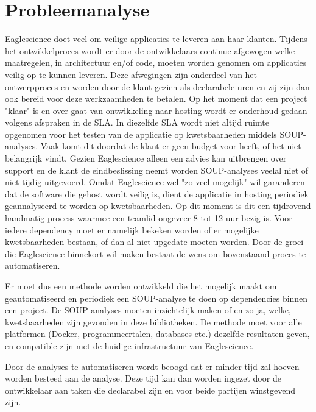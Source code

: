 \section{Probleemanalyse}\label{sec:probleemanalyse}
Eaglescience doet veel om veilige applicaties te leveren aan haar klanten. Tijdens het ontwikkelproces wordt er door de ontwikkelaars continue afgewogen welke maatregelen, in architectuur en/of code, moeten worden genomen om applicaties veilig op te kunnen leveren. Deze afwegingen zijn onderdeel van het ontwerpproces en worden door de klant gezien als declarabele uren en zij zijn dan ook bereid voor deze werkzaamheden te betalen. Op het moment dat een project "klaar" is en over gaat van ontwikkeling naar hosting wordt er onderhoud gedaan volgens afspraken in de SLA. In diezelfde SLA wordt niet altijd ruimte opgenomen voor het testen van de applicatie op kwetsbaarheden middels SOUP-analyses. Vaak komt dit doordat de klant er geen budget voor heeft, of het niet belangrijk vindt. Gezien Eaglescience alleen een advies kan uitbrengen over support en de klant de eindbeslissing neemt worden SOUP-analyses veelal niet of niet tijdig uitgevoerd. Omdat Eaglescience wel "zo veel mogelijk" wil garanderen dat de software die gehost wordt veilig is, dient de applicatie in hosting periodiek geannalyseerd te worden op kwetsbaarheden. Op dit moment is dit een tijdrovend handmatig process waarmee een teamlid ongeveer 8 tot 12 uur bezig is. Voor iedere dependency moet er namelijk bekeken worden of er mogelijke kwetsbaarheden bestaan, of dan al niet upgedate moeten worden. Door de groei die Eaglescience binnekort wil maken bestaat de wens om bovenstaand proces te automatiseren.

Er moet dus een methode worden ontwikkeld die het mogelijk maakt om geautomatiseerd en periodiek een SOUP-analyse te doen op dependencies binnen een project. De SOUP-analyses moeten inzichtelijk maken of en zo ja, welke, kwetsbaarheden zijn gevonden in deze bibliotheken. De methode moet voor alle platformen (Docker, programmeertalen, databases etc.) dezelfde resultaten geven, en compatible zijn met de huidige infrastructuur van Eaglescience.

Door de analyses te automatiseren wordt beoogd dat er minder tijd zal hoeven worden besteed aan de analyse. Deze tijd kan dan worden ingezet door de ontwikkelaar aan taken die declarabel zijn en voor beide partijen winstgevend zijn.


